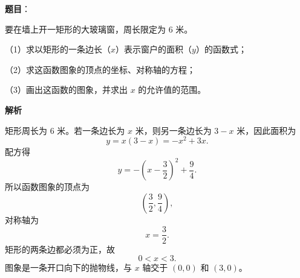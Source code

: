 \begin{answer}

\textbf{题目}：

要在墙上开一矩形的大玻璃窗，周长限定为 $6$ 米。

（1）求以矩形的一条边长（$x$）表示窗户的面积（$y$）的函数式；

（2）求这函数图象的顶点的坐标、对称轴的方程；

（3）画出这函数的图象，并求出 $x$ 的允许值的范围。

\textbf{解析}

矩形周长为 $6$ 米。若一条边长为 $x$ 米，则另一条边长为 $3-x$ 米，因此面积为
\nopagebreak[4]
\[
y=x(3-x)=-x^2+3x.
\]
配方得
\nopagebreak[4]
\[
y=-\left(x-\frac32\right)^2+\frac94.
\]
所以函数图象的顶点为
\nopagebreak[4]
\[
\left(\frac32,\frac94\right),
\]
对称轴为
\nopagebreak[4]
\[
x=\frac32.
\]
矩形的两条边都必须为正，故
\nopagebreak[4]
\[
0<x<3.
\]
图象是一条开口向下的抛物线，与 $x$ 轴交于 $(0,0)$ 和 $(3,0)$。
\nopagebreak[4]
\begin{center}\end{center}
\nopagebreak[4]

\end{answer}
